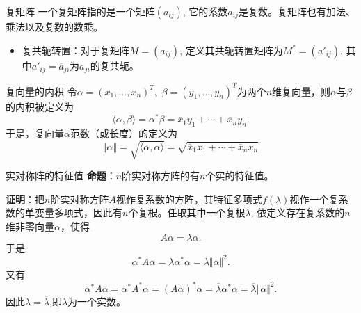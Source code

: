\documentclass[10pt]{beamer}
\begin{document}
\begin{frame}

\begin{block}{复矩阵}
一个复矩阵指的是一个矩阵$(a_{ij})$, 它的系数$a_{ij}$是复数。复矩阵也有加法、乘法以及复数的数乘。

\pause

\begin{itemize}
\item 复共轭转置：对于复矩阵$M = (a_{ij})$, 定义其共轭转置矩阵为$M^* = (a'_{ij})$, 其中$a'_{ij} = \overline{a}_{ji}$为$a_{ji}$的复共轭。
\end{itemize}
\end{block}

\vspace{1em}
\pause

\begin{block}{复向量的内积}
令$\alpha = (x_1,\ldots,x_n)^T,$ $\beta = (y_1,\ldots,y_n)^T$为两个$n$维复向量，则$\alpha$与$\beta$的内积被定义为
$$\langle \alpha, \beta \rangle = \alpha^*\beta = \overline{x}_1y_1 + \cdots + \overline{x}_ny_n.$$
于是，复向量$\alpha$范数（或长度）的定义为
$$\Vert \alpha \Vert = \sqrt{\langle \alpha, \alpha \rangle} = \sqrt{\overline{x}_1x_1 + \cdots + \overline{x}_nx_n}$$
\end{block}

\end{frame}


\begin{frame}

\begin{block}{实对称阵的特征值}
{\bfseries 命题}：$n$阶实对称方阵的有$n$个实的特征值。

\vspace{1em}
\pause

{\bfseries 证明}：把$n$阶实对称方阵$A$视作复系数的方阵，其特征多项式$f(\lambda)$视作一个复系数的单变量多项式，因此有$n$个复根。任取其中一个复根$\lambda$, 依定义存在复系数的$n$维非零向量$\alpha$，使得
$$A\alpha = \lambda\alpha.$$
于是
$$\alpha^*A\alpha = \lambda \alpha^*\alpha = \lambda \Vert \alpha \Vert^2.$$
又有
$$\alpha^*A\alpha = \alpha^*A^*\alpha = (A\alpha)^*\alpha = \overline{\lambda}\alpha^*\alpha = \overline{\lambda} \Vert \alpha \Vert^2.$$
因此$\lambda = \overline{\lambda}$,即$\lambda$为一个实数。
\end{block}

\end{frame}
\end{document}
